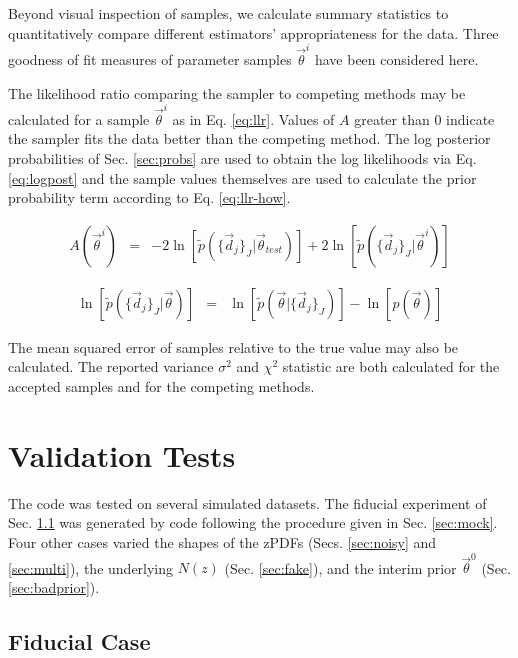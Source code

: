 \documentclass[preprint]{aastex}
\begin{document}
Beyond visual inspection of samples, we calculate summary statistics to quantitatively compare different estimators' appropriateness for the data.  Three goodness of fit measures of parameter samples $\vec{\theta}^{i}$  have been considered here.  

The likelihood ratio comparing the sampler to competing methods may be calculated for a sample $\vec{\theta}^{i}$ as in Eq. \ref{eq:llr}.  Values of $A$ greater than 0 indicate the sampler fits the data better than the competing method.  The log posterior probabilities of Sec. \ref{sec:probs} are used to obtain the log likelihoods via Eq. \ref{eq:logpost} and the sample values themselves are used to calculate the prior probability term according to Eq. \ref{eq:llr-how}.

\begin{eqnarray}
\label{eq:llr}
A(\vec{\theta}^{i}) &=& -2\ln[\tilde{p}(\{\vec{d}_{j}\}_{J}|\vec{\theta}_{test})]+2\ln[\tilde{p}(\{\vec{d}_{j}\}_{J}|\vec{\theta}^{i})]
\end{eqnarray}

\begin{eqnarray}
\label{eq:llr-how}
\ln[\tilde{p}(\{\vec{d}_{j}\}_{J}|\vec{\theta})] &=& \ln[\tilde{p}(\vec{\theta}|\{\vec{d}_{j}\}_{J})]-\ln[p(\vec{\theta})]
\end{eqnarray}

The mean squared error of samples relative to the true value may also be calculated.  The reported variance $\sigma^{2}$ and $\chi^{2}$ statistic are both calculated for the accepted samples and for the competing methods.

\clearpage
\section{Validation Tests}
\label{sec:valid}

The code was tested on several simulated datasets.  The fiducial experiment of Sec. \ref{sec:null} was generated by code following the procedure given in Sec. \ref{sec:mock}.  Four other cases varied the shapes of the zPDFs (Secs. \ref{sec:noisy} and \ref{sec:multi}), the underlying $N(z)$ (Sec. \ref{sec:fake}), and the interim prior $\vec{\theta}^{0}$ (Sec. \ref{sec:badprior}).  

\clearpage
\subsection{Fiducial Case}
\label{sec:null}
\end{document}
